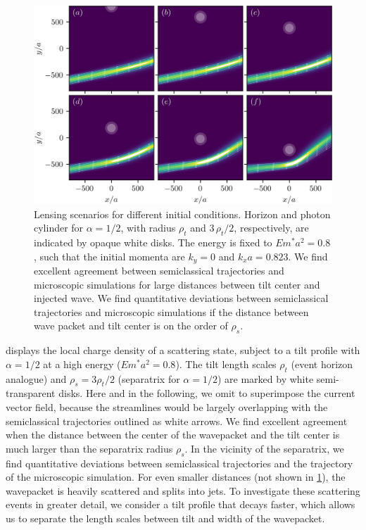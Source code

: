\documentclass[submission, Phys]{SciPost}
\begin{document}
\begin{figure}[ht]
    \centering
    \includegraphics{fig/trajectories_alpha_0.5.jpg}
    \caption{Lensing scenarios for different initial conditions. 
     Horizon and photon cylinder for $\alpha=1/2$, with radius $\rho_t$ and $3\,\rho_t/2$, respectively, are indicated by opaque white disks. The energy is fixed to $Em^*a^2=0.8$, such that the initial momenta are $k_y=0$ and $k_xa=0.823$. We find excellent agreement between semiclassical trajectories and microscopic simulations for large distances between tilt center and injected wave. We find quantitative deviations between semiclassical trajectories and microscopic simulations if the distance between wave packet and tilt center is on the order of $\rho_s$.}
    \label{fig:microscopic_semiclassics_alpha_1/2}
\end{figure}

 displays the local charge density of a scattering state, subject to a tilt profile with $\alpha=1/2$ at a high energy ($Em^*a^2=0.8$).
The tilt length scales $\rho_t$ (event horizon analogue) and $\rho_s=3\rho_t/2$ (separatrix for $\alpha=1/2$) are marked by white semi-transparent disks.
Here and in the following, we omit to superimpose the current vector field, because the streamlines would be largely overlapping with the semiclassical trajectories outlined as white arrows.
We find excellent agreement when the distance between the center of the wavepacket and the tilt center is much larger than the separatrix radius $\rho_s$.
In the vicinity of the separatrix, we find quantitative deviations between semiclassical trajectories and the trajectory of the microscopic simulation. For even smaller distances (not shown in \cref{fig:microscopic_semiclassics_alpha_1/2}), the wavepacket is heavily scattered and splits into jets. To investigate these scattering events in greater detail, we consider a tilt profile that decays faster, which allows us to separate the length scales between tilt and width of the wavepacket.
\end{document}
